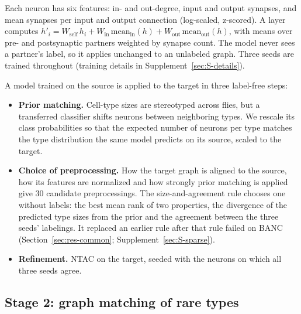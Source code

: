 \documentclass[11pt,a4paper]{article}
\begin{document}
Each neuron has six features: in- and out-degree, input and output synapses, and mean synapses per input and output connection (log-scaled, z-scored). A layer computes $h'_i = W_{\mathrm{self}}\, h_i + W_{\mathrm{in}}\, \mathrm{mean}_{\mathrm{in}}(h) + W_{\mathrm{out}}\, \mathrm{mean}_{\mathrm{out}}(h)$, with means over pre- and postsynaptic partners weighted by synapse count. The model never sees a partner's label, so it applies unchanged to an unlabeled graph. Three seeds are trained throughout (training details in Supplement~\ref{sec:S-details}).

A model trained on the source is applied to the target in three label-free steps:

\begin{itemize}[leftmargin=*,itemsep=2pt]

\item \textbf{Prior matching.} Cell-type sizes are stereotyped across flies, but a transferred classifier shifts neurons between neighboring types. We rescale its class probabilities so that the expected number of neurons per type matches the type distribution the same model predicts on its source, scaled to the target.

\item \textbf{Choice of preprocessing.} How the target graph is aligned to the source, how its features are normalized and how strongly prior matching is applied give 30 candidate preprocessings. The size-and-agreement rule chooses one without labels: the best mean rank of two properties, the divergence of the predicted type sizes from the prior and the agreement between the three seeds' labelings. It replaced an earlier rule after that rule failed on BANC (Section~\ref{sec:res-common}; Supplement~\ref{sec:S-sparse}).

\item \textbf{Refinement.} NTAC on the target, seeded with the neurons on which all three seeds agree.

\end{itemize}

\subsection{Stage 2: graph matching of rare types}\label{sec:stage2}
\end{document}
